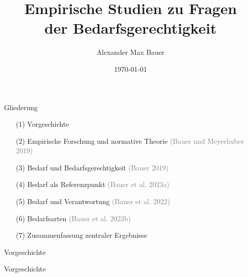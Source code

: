 \documentclass[xcolor=table,9pt,aspectratio=169]{beamer}
\title{Empirische Studien zu Fragen\\der Bedarfsgerechtigkeit}
\subtitle{}
\author{Alexander Max Bauer}
\date{\renewcommand{\dateseparator}{.}\ddmmyyyydate\today}
\begin{document}
{
\begin{frame}
   \maketitle
\end{frame}
}


\begin{frame}{\vspace*{10mm}Gliederung}
\vspace*{-10mm}
\begin{itemize}
   \item[(1)] Vorgeschichte
   \item[(2)] Empirische Forschung und normative Theorie \textcolor{gray}{(Bauer und Meyerhuber 2019)}
   \item[(3)] Bedarf und Bedarfsgerechtigkeit \textcolor{gray}{(Bauer 2019)}
   \item[(4)] Bedarf als Referenzpunkt \textcolor{gray}{(Bauer et al. 2023a)}
   \item[(5)] Bedarf und Verantwortung \textcolor{gray}{(Bauer et al. 2022)}
   \item[(6)] Bedarfsarten \textcolor{gray}{(Bauer et al. 2023b)}
   \item[(7)] Zusammenfassung zentraler Ergebnisse
\end{itemize}
\end{frame}


\begin{frame}{\vspace*{10mm}Vorgeschichte}
\end{frame}


\begin{frame}{\vspace*{10mm}Vorgeschichte}
\end{frame}
\end{document}
